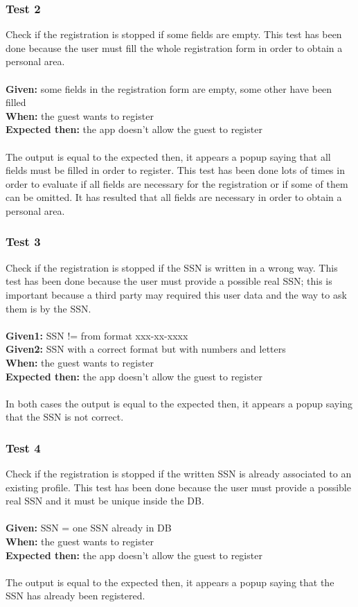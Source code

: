 \subsubsection{\Large{Test 2}}
Check if the registration is stopped if some fields are empty. This test has been done because the user must fill the whole registration form in order to obtain a personal area.\\
\\
\textbf{Given: } some fields in the registration form are empty, some other have been filled\\
\textbf{When: } the guest wants to register\\
\textbf{Expected then: } the app doesn't allow the guest to register\\
\\
The output is equal to the expected then, it appears a popup saying that all fields must be filled in order to register. This test has been done lots of times in order to evaluate if all fields are necessary for the registration or if some of them can be omitted. It has resulted that all fields are necessary in order to obtain a personal area.

\subsubsection{\Large{Test 3}}
Check if the registration is stopped if the SSN is written in a wrong way. This test has been done because the user must provide a possible real SSN; this is important because a third party may required this user data and the way to ask them is by the SSN.\\
\\
\textbf{Given1: } SSN != from format xxx-xx-xxxx \\
\textbf{Given2: } SSN with a correct format but with numbers and letters\\
\textbf{When: } the guest wants to register\\
\textbf{Expected then: } the app doesn't allow the guest to register\\
\\
In both cases the output is equal to the expected then, it appears a popup saying that the SSN is not correct.

\subsubsection{\Large{Test 4}}
Check if the registration is stopped if the written SSN is already associated to an existing profile. This test has been done because the user must provide a possible real SSN and it must be unique inside the DB.\\
\\
\textbf{Given: } SSN = one SSN already in DB\\
\textbf{When: } the guest wants to register\\
\textbf{Expected then: } the app doesn't allow the guest to register\\
\\
The output is equal to the expected then, it appears a popup saying that the SSN has already been registered.

